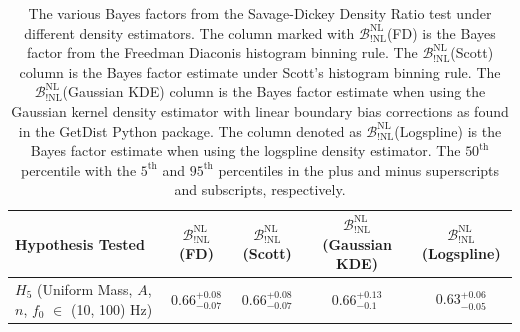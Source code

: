 \begin{table}
\centering
\begin{tabularx}{1.0\textwidth}{l| c |c |c| c}
\hline\hline
 Hypothesis Tested  & $\mathcal{B}^{\mathrm{NL}}_{\mathrm{!NL}}$(FD)  & $\mathcal{B}^{\mathrm{NL}}_{\mathrm{!NL}}$(Scott) & $\mathcal{B}^{\mathrm{NL}}_{\mathrm{!NL}}$(Gaussian KDE) & $\mathcal{B}^{\mathrm{NL}}_{\mathrm{!NL}}$(Logspline)\\
\hline\hline
$H_5$ (Uniform Mass, $A$, $n$, $f_0$ $\in$ (10, 100) Hz) &
$0.66^{+0.08}_{-0.07}$ & $0.66^{+0.08}_{-0.07}$ & $0.66^{+0.13}_{-0.1}$ & $0.63^{+0.06}_{-0.05}$ \\
\hline\hline
\end{tabularx}
\caption{The various Bayes factors from the Savage-Dickey Density Ratio test under different density estimators. The column marked with $\mathcal{B}^{\mathrm{NL}}_{\mathrm{!NL}}$(FD) is the Bayes factor from the Freedman Diaconis histogram binning rule. The $\mathcal{B}^{\mathrm{NL}}_{\mathrm{!NL}}$(Scott) column is the Bayes factor estimate under Scott's histogram binning rule. The $\mathcal{B}^{\mathrm{NL}}_{\mathrm{!NL}}$(Gaussian KDE) column is the Bayes factor estimate when using the Gaussian kernel density estimator with linear boundary bias corrections as found in the GetDist Python package. The column denoted as  $\mathcal{B}^{\mathrm{NL}}_{\mathrm{!NL}}$(Logspline) is the Bayes factor estimate when using the logspline density estimator. The $50^{\mathrm{th}}$ percentile with the $5^{\mathrm{th}}$ and $95^{\mathrm{th}}$ percentiles in the plus and minus superscripts and subscripts, respectively.}\label{table:Bayes_sddr}
\end{table}
